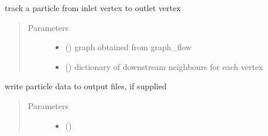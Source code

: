 \documentclass[letterpaper,10pt,english]{sphinxmanual}
\begin{document}
\begin{fulllineitems}
\begin{fulllineitems}
\end{fulllineitems}


\begin{fulllineitems}
\label{\detokenize{pydfnworks:pydfnworks.dfnGraph.graph_transport.Particle.track}}
track a particle from inlet vertex to outlet vertex
\begin{quote}\begin{description}
\item[{Parameters}] \leavevmode\begin{itemize}
\item {} 
 () \textendash{} graph obtained from graph\_flow

\item {} 
 () \textendash{} dictionary of downstream neighbours for each vertex

\end{itemize}

\end{description}\end{quote}

\end{fulllineitems}


\begin{fulllineitems}
\label{\detokenize{pydfnworks:pydfnworks.dfnGraph.graph_transport.Particle.write_file}}
write particle data to output files, if supplied
\begin{quote}\begin{description}
\item[{Parameters}] \leavevmode\begin{itemize}
\item {} 
 () \textendash{} 


\end{itemize}
\end{description}
\end{quote}
\end{fulllineitems}
\end{fulllineitems}
\end{document}
